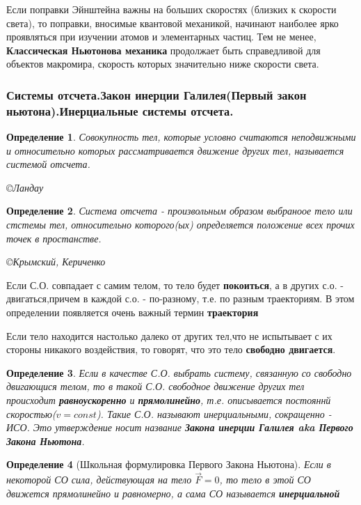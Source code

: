 \documentclass{article}
\newtheorem{theorem}{Определение} %
\begin{document}
Если поправки Эйнштейна важны на больших скоростях (близких к скорости света), то поправки, вносимые квантовой механикой, начинают наиболее ярко проявляться при изучении атомов и элементарных частиц. Тем не менее, \textbf{Классическая Ньютонова механика} продолжает быть справедливой для объектов макромира, скорость которых значительно ниже скорости света.

\subsubsection{Системы отсчета.Закон инерции Галилея(Первый закон ньютона).Инерциальные системы отсчета.}
\begin{theorem}
Совокупность тел, которые условно считаются неподвижными и относительно которых рассматривается движение других тел, называется системой отсчета.

\copyright{Ландау}
\end{theorem}


\begin{theorem}
Система отсчета - произвольным образом выбраноое тело или стстемы тел, относительно которого(ых) определяется положение всех прочих точек в простанстве. 

\copyright{Крымский, Кериченко}
\end{theorem} 

Если С.О. совпадает с самим телом, то тело будет \textbf{покоиться},  а в других с.о. - двигаться,причем в каждой с.о. - по-разному, т.е. по разным траекториям. В этом определении появляется очень важный термин \textbf{траектория}

Если тело находится настолько далеко от других тел,что не испытывает с их стороны никакого воздействия, то говорят, что это тело \textbf{свободно двигается}. 

\begin{theorem}
Если в качестве С.О. выбрать систему, связанную со свободно  двигающися телом, то в такой С.О. свободное движение других тел происходит \textbf{равноускоренно} и \textbf{прямолинейно}, т.е. описывается постояннй скоростью($v=const$). Такие С.О. называют инерциальными, сокращенно - ИСО. Это утверждение носит название \textbf{Закона инерции Галилея aka Первого Закона Ньютона}.
\end{theorem}



\begin{theorem}[Школьная формулировка Первого Закона Ньютона]
Если в некоторой СО сила, действующая на тело $\vec{F}=0$, то тело в этой СО движется прямолинейно и равномерно, а сама СО называется \textbf{инерциальной}
\end{theorem}
\end{document}
